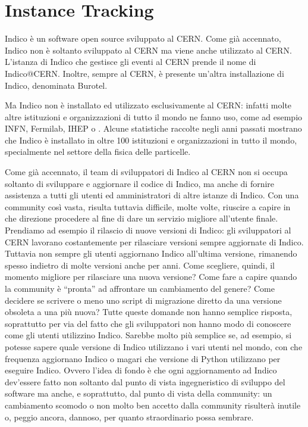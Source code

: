 \chapter{Instance Tracking} \label{chap:instance_tracker}

    Indico è un software open source sviluppato al \ac{CERN}. Come già accennato, Indico non è soltanto sviluppato al \ac{CERN} ma viene anche utilizzato al \ac{CERN}. L'istanza di Indico che gestisce gli eventi al \ac{CERN} prende il nome di Indico@CERN. Inoltre, sempre al \ac{CERN}, è presente un'altra installazione di Indico, denominata Burotel.
    
    Ma Indico non è installato ed utilizzato esclusivamente al \ac{CERN}: infatti molte altre istituzioni e organizzazioni di tutto il mondo ne fanno uso, come ad esempio \ac{INFN}, Fermilab, \ac{IHEP} o . Alcune statistiche raccolte negli anni passati mostrano che Indico è installato in oltre 100 istituzioni e organizzazioni in tutto il mondo, specialmente nel settore della fisica delle particelle.
    
    Come già accennato, il team di sviluppatori di Indico al \ac{CERN} non si occupa soltanto di sviluppare e aggiornare il codice di Indico, ma anche di fornire assistenza a tutti gli utenti ed amministratori di altre istanze di Indico. Con una community così vasta, risulta tuttavia difficile, molte volte, riuscire a capire in che direzione procedere al fine di dare un servizio migliore all'utente finale. Prendiamo ad esempio il rilascio di nuove versioni di Indico: gli sviluppatori al \ac{CERN} lavorano costantemente per rilasciare versioni sempre aggiornate di Indico. Tuttavia non sempre gli utenti aggiornano Indico all'ultima versione, rimanendo spesso indietro di molte versioni anche per anni. Come scegliere, quindi, il momento migliore per rilasciare una nuova versione? Come fare a capire quando la community è ``pronta'' ad affrontare un cambiamento del genere? Come decidere se scrivere o meno uno script di migrazione diretto da una versione obsoleta a una più nuova? Tutte queste domande non hanno semplice risposta, soprattutto per via del fatto che gli sviluppatori non hanno modo di conoscere come gli utenti utilizzino Indico. Sarebbe molto più semplice se, ad esempio, si potesse sapere quale versione di Indico utilizzano i vari utenti nel mondo, con che frequenza aggiornano Indico o magari che versione di Python utilizzano per eseguire Indico. Ovvero l'idea di fondo è che ogni aggiornamento ad Indico dev'essere fatto non soltanto dal punto di vista ingegneristico di sviluppo del software ma anche, e soprattutto, dal punto di vista della community: un cambiamento scomodo o non molto ben accetto dalla community risulterà inutile o, peggio ancora, dannoso, per quanto straordinario possa sembrare.
    
